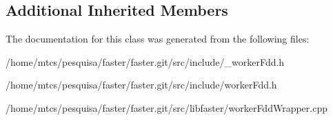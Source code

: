 \subsection*{Additional Inherited Members}


The documentation for this class was generated from the following files\+:\begin{DoxyCompactItemize}
\item 
/home/mtcs/pesquisa/faster/faster.\+git/src/include/\+\_\+worker\+Fdd.\+h\item 
/home/mtcs/pesquisa/faster/faster.\+git/src/include/worker\+Fdd.\+h\item 
/home/mtcs/pesquisa/faster/faster.\+git/src/libfaster/worker\+Fdd\+Wrapper.\+cpp\end{DoxyCompactItemize}
